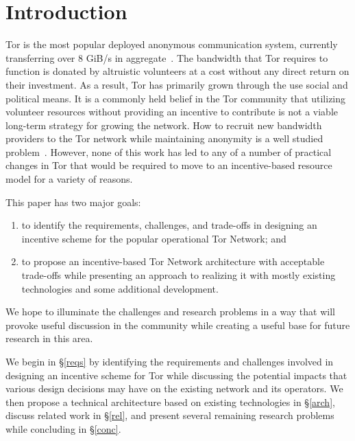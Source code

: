 \section{Introduction}

Tor is the most popular deployed anonymous communication system, currently
transferring over 8 GiB/s in aggregate~\cite{tornetmet}. The bandwidth that Tor
requires to function is donated by altruistic volunteers at a cost without any
direct return on their investment. As a result, Tor has primarily grown through
the use social and political means. It is a commonly held belief in the Tor
community that utilizing volunteer resources without providing an incentive to
contribute is not a viable long-term strategy for growing the network. How to
recruit new bandwidth providers to the Tor network while maintaining anonymity
is a well studied problem~\cite{raykova-pet2008, wpes09-xpay, incentives-fc10,
ccs10-braids, acsac11-tortoise, jansen2013lira, johnson2013onions}. However,
none of this work has led to any of a number of practical changes in Tor that
would be required to move to an incentive-based resource model for a variety of
reasons.

This paper has two major goals:
\begin{enumerate}
\item to identify the requirements, challenges, and trade-offs in designing an
incentive scheme for the popular operational Tor Network; and 
\item to propose an incentive-based Tor Network architecture with acceptable
trade-offs while presenting an approach to realizing it with mostly existing
technologies and some additional development.
\end{enumerate}
We hope to illuminate the challenges and research problems in a way that will
provoke useful discussion in the community while creating a useful base for
future research in this area.

We begin in \S\ref{reqs} by identifying the requirements and challenges involved
in designing an incentive scheme for Tor while discussing the potential impacts
that various design decisions may have on the existing network and its
operators. We then propose a technical architecture based on existing
technologies in \S\ref{arch}, discuss related work in \S\ref{rel}, and present
several remaining research problems while concluding in \S\ref{conc}.